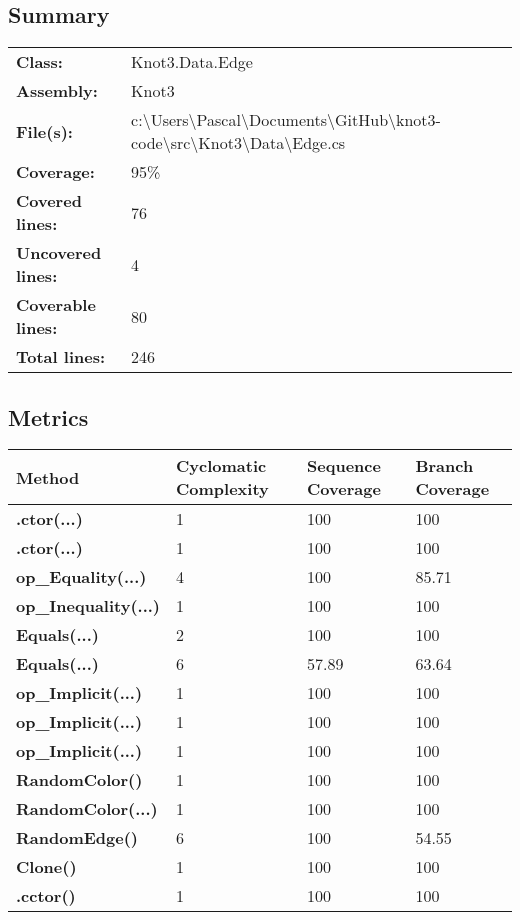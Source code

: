 \documentclass[a4paper,10pt]{article}
\begin{document}
\subsection{Summary}
\begin{longtable}[l]{ll}
\textbf{Class:} & Knot3.Data.Edge\\
\textbf{Assembly:} & Knot3\\
\textbf{File(s):} & \begin{minipage}[t]{12cm}{c:\textbackslash Users\textbackslash Pascal\textbackslash Documents\textbackslash GitHub\textbackslash knot3-code\textbackslash src\textbackslash Knot3\textbackslash Data\textbackslash Edge.cs}\end{minipage} \\
\textbf{Coverage:} & 95\%\\
\textbf{Covered lines:} & 76\\
\textbf{Uncovered lines:} & 4\\
\textbf{Coverable lines:} & 80\\
\textbf{Total lines:} & 246\\
\end{longtable}
\subsection{Metrics}
\begin{longtable}[l]{|l|l|l|l|}
\hline
\textbf{Method} & \textbf{Cyclomatic Complexity} & \textbf{Sequence Coverage} & \textbf{Branch Coverage}\\
\hline
\textbf{.ctor(...)} & 1 & 100 & 100\\
\hline
\textbf{.ctor(...)} & 1 & 100 & 100\\
\hline
\textbf{op\_Equality(...)} & 4 & 100 & 85.71\\
\hline
\textbf{op\_Inequality(...)} & 1 & 100 & 100\\
\hline
\textbf{Equals(...)} & 2 & 100 & 100\\
\hline
\textbf{Equals(...)} & 6 & 57.89 & 63.64\\
\hline
\textbf{op\_Implicit(...)} & 1 & 100 & 100\\
\hline
\textbf{op\_Implicit(...)} & 1 & 100 & 100\\
\hline
\textbf{op\_Implicit(...)} & 1 & 100 & 100\\
\hline
\textbf{RandomColor()} & 1 & 100 & 100\\
\hline
\textbf{RandomColor(...)} & 1 & 100 & 100\\
\hline
\textbf{RandomEdge()} & 6 & 100 & 54.55\\
\hline
\textbf{Clone()} & 1 & 100 & 100\\
\hline
\textbf{.cctor()} & 1 & 100 & 100\\
\hline
\end{longtable}
\end{document}
